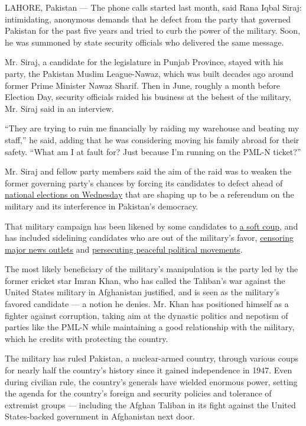 LAHORE, Pakistan --- The phone calls started last month, said Rana Iqbal
Siraj: intimidating, anonymous demands that he defect from the party
that governed Pakistan for the past five years and tried to curb the
power of the military. Soon, he was summoned by state security officials
who delivered the same message.

Mr. Siraj, a candidate for the legislature in Punjab Province, stayed
with his party, the Pakistan Muslim League-Nawaz, which was built
decades ago around former Prime Minister Nawaz Sharif. Then in June,
roughly a month before Election Day, security officials raided his
business at the behest of the military, Mr. Siraj said in an interview.

``They are trying to ruin me financially by raiding my warehouse and
beating my staff,'' he said, adding that he was considering moving his
family abroad for their safety. ``What am I at fault for? Just because
I'm running on the PML-N ticket?''

Mr. Siraj and fellow party members said the aim of the raid was to
weaken the former governing party's chances by forcing its candidates to
defect ahead of
\href{https://www.nytimes.com/2018/07/23/world/asia/pakistan-election-explainer.html}{national
elections on Wednesday} that are shaping up to be a referendum on the
military and its interference in Pakistan's democracy.

That military campaign has been likened by some candidates to
\href{https://www.nytimes.com/2018/06/06/world/asia/pakistan-military-dissent-censorship.html}{a
soft coup}, and has included sidelining candidates who are out of the
military's favor,
\href{https://www.nytimes.com/2018/04/06/world/asia/pakistan-geo-military-censorship.html}{censoring
major news outlets} and
\href{https://www.nytimes.com/2018/04/17/world/asia/pashtun-movement-pakistan-military.html}{persecuting
peaceful political movements}.

The most likely beneficiary of the military's manipulation is the party
led by the former cricket star Imran Khan, who has called the Taliban's
war against the United States military in Afghanistan justified, and is
seen as the military's favored candidate --- a notion he denies. Mr.
Khan has positioned himself as a fighter against corruption, taking aim
at the dynastic politics and nepotism of parties like the PML-N while
maintaining a good relationship with the military, which he credits with
protecting the country.

The military has ruled Pakistan, a nuclear-armed country, through
various coups for nearly half the country's history since it gained
independence in 1947. Even during civilian rule, the country's generals
have wielded enormous power, setting the agenda for the country's
foreign and security policies and tolerance of extremist groups ---
including the Afghan Taliban in its fight against the United
States-backed government in Afghanistan next door.

